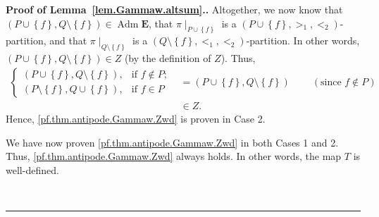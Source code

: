 \documentclass[numbers=enddot,12pt,final,onecolumn,notitlepage,abstracton]{scrartcl}
\theoremstyle{definition}
\newenvironment{proof}[1][Proof]{\noindent\textbf{#1.} }{\ \rule{0.5em}{0.5em}}
\newcommand{\Adm}{\operatorname{Adm}}
\newcommand{\EE}{{\mathbf{E}}}
\begin{document}
\begin{proof}[Proof of Lemma~\ref{lem.Gammaw.altsum}.]
Altogether, we now know that $\left(  P\cup\left\{  f\right\}  ,Q\setminus
\left\{  f\right\}  \right)  \in \Adm \EE$, that $\pi
\mid_{P\cup\left\{  f\right\}  }$ is a $\left(  P\cup\left\{  f\right\}
,>_{1},<_{2}\right)  $-partition, and that $\pi\mid_{Q\setminus\left\{
f\right\}  }$ is a $\left(  Q\setminus\left\{  f\right\}  ,<_{1},<_{2}\right)
$-partition. In other words, $\left(  P\cup\left\{  f\right\}  ,Q\setminus
\left\{  f\right\}  \right)  \in Z$ (by the definition of $Z$). Thus,
\begin{align*}
\begin{cases}
\left(  P\cup\left\{  f\right\}  ,Q\setminus\left\{  f\right\}  \right)  , &
\text{if }f\notin P;\\
\left(  P\setminus\left\{  f\right\}  ,Q\cup\left\{  f\right\}  \right)  , &
\text{if }f\in P
\end{cases}
& =\left(  P\cup\left\{  f\right\}  ,Q\setminus\left\{  f\right\}  \right)
\ \ \ \ \ \ \ \ \ \ \left(  \text{since }f\notin P\right)  \\
& \in Z.
\end{align*}
Hence, \eqref{pf.thm.antipode.Gammaw.Zwd} is proven in Case 2.

We have now proven \eqref{pf.thm.antipode.Gammaw.Zwd} in both Cases 1 and 2.
Thus, \eqref{pf.thm.antipode.Gammaw.Zwd} always holds. In other words, the map
$T$ is well-defined.


\end{proof}
\end{document}
